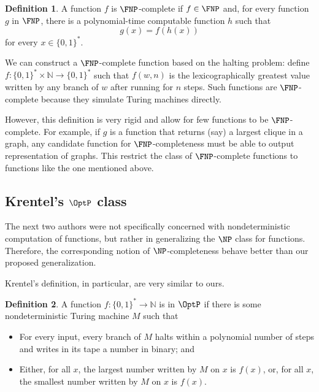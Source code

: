\documentclass[12pt]{article}
\theoremstyle{definition}
\newtheorem{definition}{Definition}
\begin{document}
\begin{definition}
    A function $f$ is $\FNP$-complete if $f \in \FNP$ and,
    for every function $g$ in $\FNP$,
    there is a polynomial-time computable function $h$ such that
    \begin{equation*}
        g(x) = f(h(x))
    \end{equation*}
    for every $x \in \{0, 1\}^*$.
\end{definition}

We can construct a $\FNP$-complete function based on the halting problem:
define $f : \{0, 1\}^* \times \mathbb N \to \{0, 1\}^*$
such that $f(w, n)$ is the lexicographically greatest value written by any branch of $w$
after running for $n$ steps.
Such functions are $\FNP$-complete
because they simulate Turing machines directly.

However, this definition is very rigid
and allow for few functions to be $\FNP$-complete.
For example, if $g$ is a function that returns
(say) a largest clique in a graph,
any candidate function for $\FNP$-completeness
must be able to output representation of graphs.
This restrict the class of $\FNP$-complete functions
to functions like the one mentioned above.

\subsection{Krentel's $\OptP$ class}
\label{sec:krentel}

The next two authors were not specifically concerned
with nondeterministic computation of functions,
but rather in generalizing the $\NP$ class for functions.
Therefore, the corresponding notion of $\NP$-completeness
behave better than our proposed generalization.

Krentel's definition, in particular,
are very similar to ours.

\begin{definition}
    A function $f: \{0, 1\}^* \to \mathbb N$ is in $\OptP$
    if there is some nondeterministic Turing machine $M$ such that
    \cite[p.~493]{Krentel1988}
    \begin{itemize}
        \item For every input,
            every branch of $M$ halts within a polynomial number of steps
            and writes in its tape a number in binary; and
        \item Either,
            for all $x$, the largest number written by $M$ on $x$ is $f(x)$,
            or, for all $x$, the smallest number written by $M$ on $x$ is $f(x)$.
    \end{itemize}
\end{definition}
\end{document}
